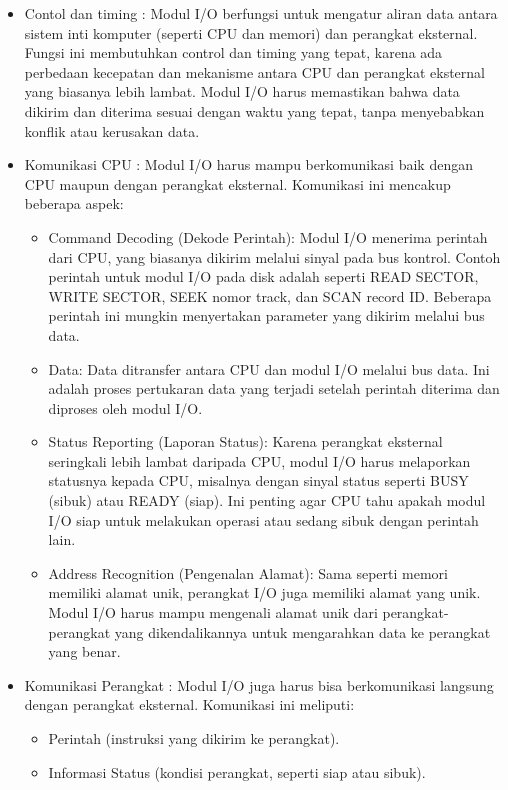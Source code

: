 \documentclass[12pt]{article}
\begin{document}
\begin{itemize}
    \item Contol dan timing : Modul I/O berfungsi untuk mengatur aliran data antara sistem inti komputer (seperti CPU dan memori) dan perangkat eksternal. Fungsi ini membutuhkan control dan timing yang tepat, karena ada perbedaan kecepatan dan mekanisme antara CPU dan perangkat eksternal yang biasanya lebih lambat. Modul I/O harus memastikan bahwa data dikirim dan diterima sesuai dengan waktu yang tepat, tanpa menyebabkan konflik atau kerusakan data.
    \item Komunikasi CPU : Modul I/O harus mampu berkomunikasi baik dengan CPU maupun dengan perangkat eksternal. Komunikasi ini mencakup beberapa aspek:
    \begin{itemize}
    \item Command Decoding (Dekode Perintah): Modul I/O menerima perintah dari CPU, yang biasanya dikirim melalui sinyal pada bus kontrol. Contoh perintah untuk modul I/O pada disk adalah seperti READ SECTOR, WRITE SECTOR, SEEK nomor track, dan SCAN record ID. Beberapa perintah ini mungkin menyertakan parameter yang dikirim melalui bus data.
    \item Data: Data ditransfer antara CPU dan modul I/O melalui bus data. Ini adalah proses pertukaran data yang terjadi setelah perintah diterima dan diproses oleh modul I/O.
    \item Status Reporting (Laporan Status): Karena perangkat eksternal seringkali lebih lambat daripada CPU, modul I/O harus melaporkan statusnya kepada CPU, misalnya dengan sinyal status seperti BUSY (sibuk) atau READY (siap). Ini penting agar CPU tahu apakah modul I/O siap untuk melakukan operasi atau sedang sibuk dengan perintah lain.
    \item Address Recognition (Pengenalan Alamat): Sama seperti memori memiliki alamat unik, perangkat I/O juga memiliki alamat yang unik. Modul I/O harus mampu mengenali alamat unik dari perangkat-perangkat yang dikendalikannya untuk mengarahkan data ke perangkat yang benar.
    \end{itemize}
    \item Komunikasi Perangkat : Modul I/O juga harus bisa berkomunikasi langsung dengan perangkat eksternal. Komunikasi ini meliputi:
    \begin{itemize}
        \item Perintah (instruksi yang dikirim ke perangkat).
        \item Informasi Status (kondisi perangkat, seperti siap atau sibuk).

\end{itemize}
\end{itemize}
\end{document}
